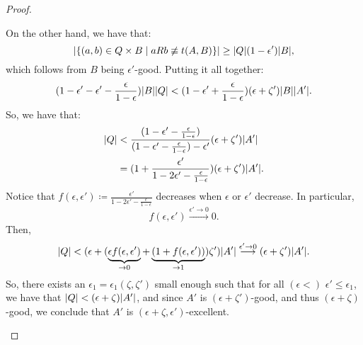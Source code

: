 \begin{lemma}
\begin{proof}
\begin{enumerate}[label=(\alph*), ref=\alph*]
                    On the other hand, we have that:
                    \[
                        | \{ (a,b) \in Q \times B \mid aRb \not\equiv t(A, B) \} | \geq
                        | Q | ( 1 - \epsilon' ) | B |,
                    \]
                    which follows from $B$ being $\epsilon'$-good.
                    Putting it all together:
                    \[
                        ( 1 - \epsilon' - \epsilon' - \frac{\epsilon}{1 - \epsilon} ) | B | | Q | <
                        ( 1 - \epsilon' + \frac{\epsilon}{1 - \epsilon} ) ( \epsilon + \zeta' ) | B | | A' |.
                    \]
                    So, we have that:
                    \begin{align*}
                        | Q | & < \frac{( 1 - \epsilon' - \frac{\epsilon}{1 - \epsilon} )}
                                            {( 1 - \epsilon' - \frac{\epsilon}{1 - \epsilon} ) - \epsilon'}
                                            ( \epsilon + \zeta' ) | A' | \\
                                        & = ( 1 + \frac{\epsilon'}{1 - 2\epsilon' - \frac{\epsilon}{1 - \epsilon}} )
                                            (\epsilon + \zeta') |A'|.
                    \end{align*}
                    Notice that $f(\epsilon, \epsilon') \coloneqq \frac{\epsilon'}{1 - 2\epsilon' - \frac{\epsilon}{1 - \epsilon}}$
                    decreases when $\epsilon$ or $\epsilon'$ decrease.
                    In particular,
                    \[
                        f(\epsilon, \epsilon') \overset{\epsilon' \to 0}{\longrightarrow} 0.
                    \]
                    Then,
                    \[
                        | Q | < ( \epsilon + ( \underbrace{\epsilon f(\epsilon, \epsilon')}_{\to 0} +
                        \underbrace{( 1 + f(\epsilon, \epsilon') )}_{\to 1} ) \zeta' ) |A'|
                        \overset{\epsilon' \to 0}{\longrightarrow} ( \epsilon + \zeta' ) |A'|.
                    \]
                    So, there exists an $\epsilon_1 = \epsilon_1(\zeta, \zeta')$ small enough such that for all
                    $(\epsilon <)$ $\epsilon' \leq \epsilon_1$, we have that $| Q | < ( \epsilon + \zeta ) |A'|$,
                    and since $A'$ is $(\epsilon + \zeta')$-good, and thus $(\epsilon + \zeta)$-good, we conclude that
                    $A'$ is $(\epsilon + \zeta, \epsilon')$-excellent.

\end{enumerate}
\end{proof}
\end{lemma}
